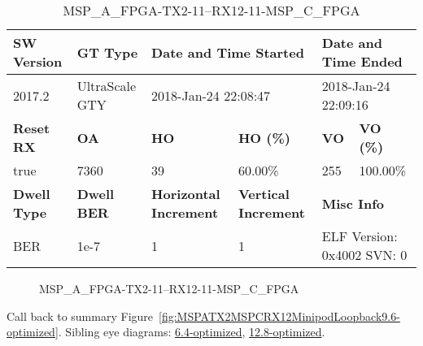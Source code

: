 \begin{table}[h]
\centering
\caption{MSP\_A\_FPGA-TX2-11--RX12-11-MSP\_C\_FPGA}
\label{tab:MSPAFPGATX211RX1211MSPCFPGA9.6-optimized}
\begin{tabular}{@{}|l|l|l|l|l|l|@{}}
\toprule
\textbf{SW Version}                & \textbf{GT Type}   & \multicolumn{2}{l|}{\textbf{Date and Time Started}}            & \multicolumn{2}{l|}{\textbf{Date and Time Ended}}        \\ \midrule
2017.2                       & UltraScale GTY          & \multicolumn{2}{l|}{2018-Jan-24 22:08:47}                   & \multicolumn{2}{l|}{2018-Jan-24 22:09:16}               \\ \midrule
\textbf{Reset RX}                  & \textbf{OA} & \textbf{HO}   & \textbf{HO (\%)} & \textbf{VO} & \textbf{VO (\%)} \\ \midrule
true & 7360        & 39          & 60.00\%        & 255        & 100.00\%       \\ \midrule
\textbf{Dwell Type}                & \textbf{Dwell BER} & \textbf{Horizontal Increment} & \textbf{Vertical Increment}    & \multicolumn{2}{l|}{\textbf{Misc Info}}                  \\ \midrule
BER                            & 1e-7        & 1        & 1           & \multicolumn{2}{l|}{ELF Version: 0x4002 SVN: 0}                         \\ \bottomrule
\end{tabular}
\end{table}

\begin{figure}[h]
\caption{MSP\_A\_FPGA-TX2-11--RX12-11-MSP\_C\_FPGA} \label{fig:MSPAFPGATX211RX1211MSPCFPGA9.6-optimized}
\end{figure}

Call back to summary Figure~\ref{fig:MSPATX2MSPCRX12MinipodLoopback9.6-optimized}.
Sibling eye diagrams: \hyperref[sec:MSPAFPGATX211RX1211MSPCFPGA6.4-optimized]{6.4-optimized}, \hyperref[sec:MSPAFPGATX211RX1211MSPCFPGA12.8-optimized]{12.8-optimized}.

\clearpage
\newpage

